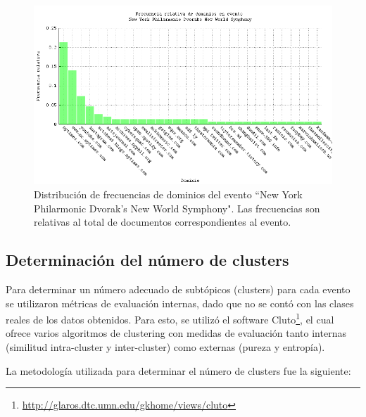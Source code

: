 \begin{figure}[h]
  \centering
  \includegraphics[width=14cm]{./img/dvorak-domain-freqs.png}
  \caption[Dominios evento 4]
   {Distribución de frecuencias de dominios del evento ``New York
  Philarmonic Dvorak's New World Symphony"\label{fig:dvorak-domains}. Las frecuencias son relativas al total de
  documentos correspondientes al evento.}
\end{figure}

\subsection{Determinación del número de clusters}
\label{sec-4.4.2}


Para determinar un número adecuado de subtópicos (clusters) para cada evento se
utilizaron métricas de evaluación internas, dado que no se contó con
las clases reales de los datos obtenidos. Para esto, se utilizó el
software Cluto\footnote{\href{http://glaros.dtc.umn.edu/gkhome/views/cluto}{http://glaros.dtc.umn.edu/gkhome/views/cluto} }, el
cual ofrece varios algoritmos de clustering con medidas de evaluación
tanto internas (similitud intra-cluster y inter-cluster) como externas
(pureza y entropía).

La metodología utilizada para determinar el número de clusters fue la
siguiente:

